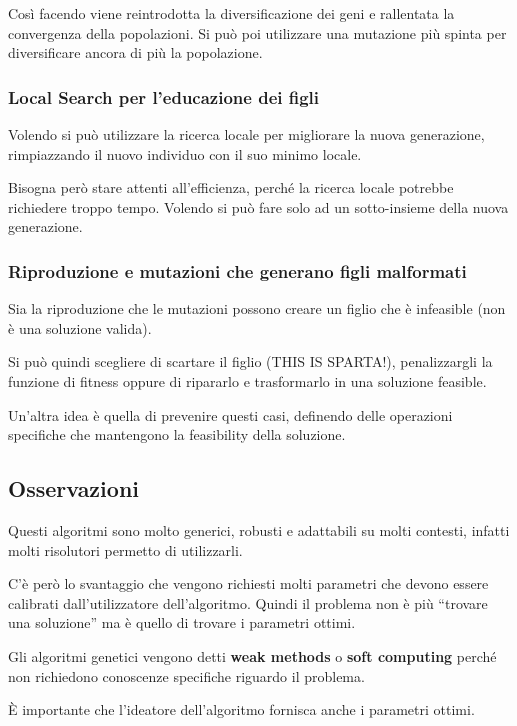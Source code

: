 Così facendo viene reintrodotta la diversificazione dei geni e rallentata la convergenza della popolazioni. Si può poi utilizzare una mutazione più spinta per diversificare ancora di più la popolazione.

\subsubsection{Local Search per l'educazione dei figli}

Volendo si può utilizzare la ricerca locale per migliorare la nuova generazione, rimpiazzando il nuovo individuo con il suo minimo locale.

Bisogna però stare attenti all'efficienza, perché la ricerca locale potrebbe richiedere troppo tempo. Volendo si può fare solo ad un sotto-insieme della nuova generazione.

\subsubsection{Riproduzione e mutazioni che generano figli malformati}

Sia la riproduzione che le mutazioni possono creare un figlio che è infeasible (non è una soluzione valida).

Si può quindi scegliere di scartare il figlio (THIS IS SPARTA!), penalizzargli la funzione di fitness oppure di ripararlo e trasformarlo in una soluzione feasible.

Un'altra idea è quella di prevenire questi casi, definendo delle operazioni specifiche che mantengono la feasibility della soluzione.

\subsection{Osservazioni}

Questi algoritmi sono molto generici, robusti e adattabili su molti contesti, infatti molti risolutori permetto di utilizzarli.

C'è però lo svantaggio che vengono richiesti molti parametri che devono essere calibrati dall'utilizzatore dell'algoritmo. Quindi il problema non è più ``trovare una soluzione'' ma è quello di trovare i parametri ottimi.

Gli algoritmi genetici vengono detti \textbf{weak methods} o \textbf{soft computing} perché non richiedono conoscenze specifiche riguardo il problema.

\`E importante che l'ideatore dell'algoritmo fornisca anche i parametri ottimi.






